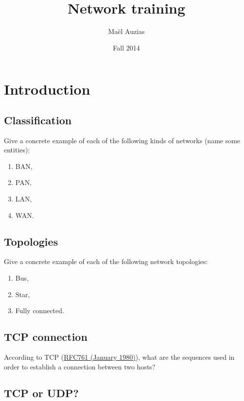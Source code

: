 \documentclass[11pt]{article}
\begin{document}
\title{Network training}
\date{Fall 2014}
\author{Maël Auzias}
\maketitle



\section{Introduction}
\subsection{Classification}
Give a concrete example of each of the following kinds of networks (name some entities):
  \begin{enumerate}
    \item BAN,  %
    \item PAN,  %
    \item LAN,  %
    \item WAN.  %
  \end{enumerate}

\subsection{Topologies}
Give a concrete example of each of the following network topologies:
  \begin{enumerate}
    \item Bus,             %
    \item Star,            %
    \item Fully connected. %
  \end{enumerate}

\subsection{TCP connection}
According to TCP (\color{blue}\href{http://tools.ietf.org/html/rfc761}{RFC761 (January 1980)})\color{black}, what are the sequences used in order to establish a connection between two hosts?

\subsection{TCP or UDP?}
\end{document}
